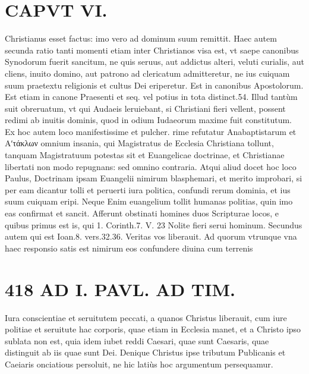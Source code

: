 \documentclass{article}
\begin{document}
\begin{pages}
\section*{CAPVT  VI. }
\marginpar{[ p.417 ]}\pstart Christianus esset factus: imo vero ad dominum suum remittit. Haec autem secunda ratio tanti momenti etiam inter Christianos visa est, vt saepe canonibus Synodorum fuerit sancitum, ne quis seruus, aut addictus alteri, veluti curialis, aut cliens, inuito domino, aut patrono ad clericatum admitteretur, ne ius cuiquam suum praetextu religionis et cultus Dei eriperetur. Est in canonibus Apostolorum. Est etiam in canone Praesenti et seq. vel potius in tota distinct.54. Illud tantùm suit obreruatum, vt qui Audaeis leruiebant, si Christiani fieri vellent, possent redimi ab inuitis dominis, quod in odium Iudaeorum maxime fuit constitutum.  \pend\pstart Ex hoc autem loco manifestissime et pulcher. rime refutatur Anabaptistarum et Αʹτάκλων omnium insania, qui Magistratus de Ecclesia Christiana tollunt, tanquam Magistratuum potestas sit et Euangelicae doctrinae, et Christianae libertati non modo repugnans: sed omnino contraria. Atqui aliud docet hoc loco Paulus, Doctrinam ipsam Euangelii nimirum blasphemari, et merito improbari, si per eam dicantur tolli et peruerti iura politica, confundi rerum dominia, et ius suum cuiquam eripi. Neque Enim euangelium tollit humanas politias, quin imo eas confirmat et sancit.  \pend\pstart Afferunt obstinati homines duos Scripturae locos, e quibus primus est is, qui 1. Corinth.7. V. 23 Nolite fieri serui hominum. Secundus autem qui est Ioan.8. vers.32.36. Veritas vos liberauit. Ad quorum vtrunque vna haec responsio satis est nimirum eos confundere diuina cum terrenis  \pend
\section*{418 AD I. PAVL. AD TIM. }
\marginpar{[ p.]}\pstart Iura conscientiae et seruitutem peccati, a quanos Christus liberauit, cum iure politiae et seruitute hac corporis, quae etiam in Ecclesia manet, et a Christo ipso sublata non est, quia idem iubet reddi Caesari, quae sunt Caesaris, quae distinguit ab iis quae sunt Dei. Denique Christus ipse tributum Publicanis et Caeiaris onciatious persoluit, ne hic latiùs hoc argumentum persequamur.  \pend
{}
{}

\end{pages}
\end{document}
